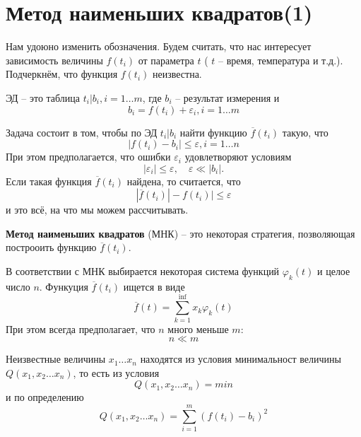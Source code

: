 \section{Метод наименьших квадратов(1)}
Нам удоюно изменить обозначения. Будем считать, что нас интересует зависимость величины $f(t_i)$ от параметра  $t$ ( $t$ -- время, температура и т.д.). Подчеркнём, что функция $f(t_i)$ неизвестна.

ЭД -- это таблица $t_i | b_i, i = 1 \dots m$, где $b_i$ -- результат измерения и 
\begin{equation}
	b_i = f(t_i) + \varepsilon_i, i = 1 \dots m
\end{equation}

Задача состоит в том, чтобы по ЭД  $t_i | b_i$ найти функцию $\overline f(t_i)$ такую, что 
\begin{equation}
	|f(t_i) - b_i| \leq \varepsilon,  i = 1 \dots n
\end{equation}
При этом предполагается, что ошибки $\varepsilon_i$ удовлетворяют условиям
\begin{equation}
	|\varepsilon_i | \leq \varepsilon , \quad \varepsilon \ll  |b_i| .
\end{equation}
Если такая функция $\overline f(t_i)$ найдена, то считается, что
\begin{equation}
	|\overline f(t_i)| - f(t_i) | \leq \varepsilon
\end{equation}
и это всё, на что мы можем рассчитывать.

\vspace{1cm}
\textbf{Метод наименьших квадратов} (МНК) --  это некоторая стратегия, позволяющая построоить функцию $\overline f(t_i)$.

В соответствии с МНК выбирается некоторая система функций $\varphi_k (t) $ и целое число $n$. Функуция $\overline f(t_i)$ ищется в виде 
\begin{equation}
	\overline{f} (t) = \sum_{k=1}^\inf {x_k \varphi_k (t) }
\end{equation}
При этом всегда предполагает, что $n$ много меньше $m$:
\begin{equation}
	n \ll m
\end{equation}

Неизвестные величины $x_1 \dots x_n$ находятся из условия минимальност величины $Q(x_1, x_2 \dots x_n)$, то есть из условия
\begin{equation} \label{eq:5.7}
	Q(x_1, x_2 \dots x_n) = min
\end{equation}
и по определению
\begin{equation} 
	Q(x_1, x_2 \dots x_n) = \sum_{i=1}^m {(f(t_i) - b_i)^2}
\end{equation}

